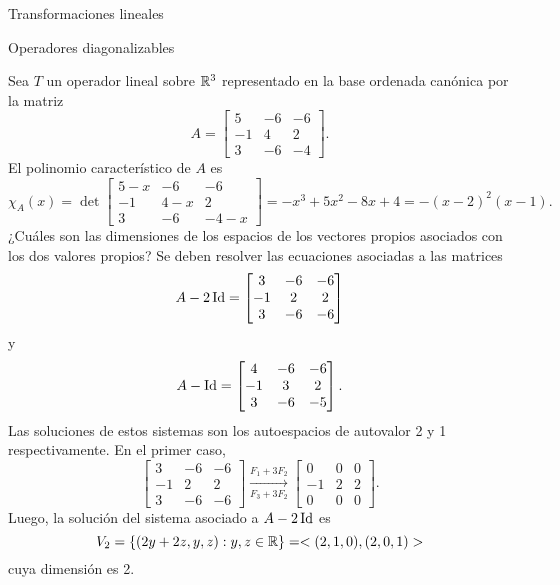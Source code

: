 \begin{chapter}{Transformaciones lineales}
\begin{section}{Operadores diagonalizables}
        \begin{ejemplo*}
            Sea $T$ un operador lineal sobre $\mathbb R^3$  representado en la base ordenada canónica por la matriz
            \begin{equation*}
                A = 
                \begin{bmatrix}
                5 &-6 &-6\\ -1& 4& 2\\3 &-6& -4
                \end{bmatrix}.
            \end{equation*}
            El  polinomio característico de $A$ es
            \begin{equation*}
                \chi_A(x) = \det \begin{bmatrix}
                    5-x &-6 &-6\\ -1& 4-x& 2\\3 &-6& -4-x
                \end{bmatrix} 
                = -x^3 + 5 x^2 - 8 x + 4 = -(x-2)^2(x-1).
            \end{equation*}
            ¿Cuáles son las dimensiones de los espacios de los vectores propios asociados
            con los dos valores propios? Se deben resolver las ecuaciones asociadas a las matrices
            \begin{equation*}
            A - 2 \operatorname{Id} = 
            \begin{bmatrix}
            3 &-6 &-6\\ -1& 2& 2\\3 &-6& -6
            \end{bmatrix} 
            \end{equation*}
            y 
            \begin{equation*}
            A -\operatorname{Id}= 
            \begin{bmatrix}
            4 &-6 &-6\\ -1& 3& 2\\3 &-6& -5
            \end{bmatrix}.
            \end{equation*}
            Las soluciones de estos sistemas son los autoespacios de autovalor 2 y 1 respectivamente. En  el primer caso, 
            \begin{equation*}
            \begin{bmatrix} 3 &-6 &-6\\ -1& 2& 2\\3 &-6& -6 \end{bmatrix}
            \underset{F_3+3F_2}{\stackrel{F_1+3 F_2}{\longrightarrow}} 
            \begin{bmatrix} 0 &0 &0\\ -1& 2& 2\\0 &0& 0 \end{bmatrix}.
            \end{equation*}
            Luego,  la solución del sistema asociado a $A-2\operatorname{Id}$ es 
            $$
            V_2 = \{(2y+2z,y,z): y,z \in \mathbb R\} = <(2,1,0),(2,0,1)>
            $$
            cuya dimensión es 2. 
            

\end{ejemplo*}
\end{section}
\end{chapter}
